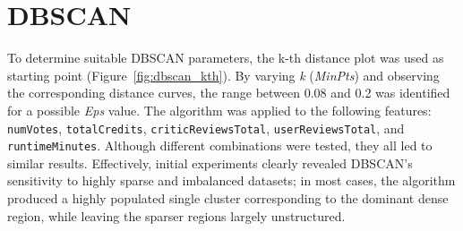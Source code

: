 


\section{DBSCAN}\label{sec:density_based}
To determine suitable DBSCAN parameters, the k-th distance plot was used as starting point (Figure~\ref{fig:dbscan_kth}). 
By varying \textit{k} (\textit{MinPts}) and observing the corresponding distance curves, the range between 0.08 and 0.2 was identified for a possible \textit{Eps} value.
The algorithm was applied to the following features: \texttt{numVotes}, \texttt{totalCredits}, \texttt{criticReviewsTotal}, \texttt{userReviewsTotal}, and \texttt{runtimeMinutes}. 
Although different combinations were tested, they all led to similar results. 
Effectively, initial experiments clearly revealed DBSCAN’s sensitivity to highly sparse and imbalanced datasets; 
in most cases, the algorithm produced a highly populated single cluster corresponding to the dominant dense region, 
while leaving the sparser regions largely unstructured.
